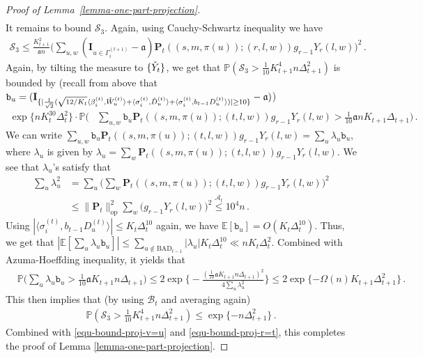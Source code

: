 \documentclass[11pt]{article}
\numberwithin{equation}{section}
\begin{document}
\begin{proof}[Proof of Lemma~\ref{lemma-one-part-projection}]
\begin{align}
\end{align}
It remains to bound $\mathcal S_3$. Again, using Cauchy-Schwartz inequality we have
\begin{align*}
    \mathcal S_3 \leq \frac{ K_{t+1}^2 }{ \mathfrak{a}n } \Big( \sum_{u,w} ( \mathbf{I}_{u \in \Gamma^{(t+1)}_i} -\mathfrak{a}) \mathbf{P}_t((s,m,\pi(u));(r,l,w)) g_{r-1} Y_r(l,w) \Big)^2 \,.  
\end{align*}
Again, by tilting the measure to $\{ \Check{Y}_t \}$, we get that $\mathbb{P}( \mathcal{S}_3 > \frac{1}{10} K_{t+1}^{4} n \Delta_{t+1}^2 )$ is bounded by (recall from above that $\mathtt{b}_u =  ( \mathbf{I}_{ \{ | \frac{1}{\sqrt{2}} ( \sqrt{12/K_t} \langle \beta^{(t)}_i, \Tilde{W}^{(t)}_u \rangle +  \langle \sigma^{(t)}_i, \Check{D}^{(t)}_u \rangle + \langle \sigma^{(t)}_i, b_{t-1}{D}^{(t)}_u \rangle ) | \geq 10 \}} -\mathfrak{a})$)
\begin{align*}
    \exp \{ n K_t^{30} \Delta_t^2 \} \cdot
    \mathbb{P} \Big( & \sum_{u,w} \mathtt{b}_u \mathbf{P}_t ((s,m,\pi(u));(t,l,w)) g_{r-1} Y_r(l,w) > \frac{1}{10} \mathfrak{a} n K_{t+1} \Delta_{t+1} \Big) \,.
\end{align*}
We can write $ \sum_{u,w} \mathtt{b}_u \mathbf{P}_t ((s,m,\pi(u));(t,l,w)) g_{r-1} Y_r(l,w) =  \sum_{u} \lambda_{u} \mathtt{b}_u $, where $\lambda_u$ is given by $\lambda_u = \sum_{w} \mathbf{P}_t((s,m,\pi(u));(t,l,w)) g_{r-1} Y_r(l,w)$. We see that $\lambda_u$'s satisfy that
\begin{align*}
    \sum_{u} \lambda_u^2 &= \sum_{u} \Big( \sum_{w} \mathbf{P}_t((s,m,\pi(u));(t,l,w)) g_{r-1} Y_r(l,w) \Big)^2 \\
    & \leq \| \mathbf{P}_t \|_{\mathrm{op}}^2 \sum_{w} \big( g_{r-1} Y_r(l,w) \big)^2 \overset{\mathcal{A}_t}{\leq} 10^4 n  \,.
\end{align*}
Using $| \langle \sigma^{(t)}_i, b_{t-1}{D}^{(t)}_u \rangle | \leq K_{t} \Delta_{t}^{10}$ again, we have $\mathbb{E}[\mathtt{b}_u] = O(K_t \Delta_t^{10})$. Thus, we get that $|\mathbb E[\sum_{u} \lambda_u \mathtt{b}_u] | \leq \sum_{u \not \in \mathrm{BAD}_{t-1}} |\lambda_{u}| K_t \Delta_{t}^{10} \ll n K_{t} \Delta_t^2$. Combined with Azuma-Hoeffding inequality, it yields that
\begin{align*}
    & \mathbb{P} \big( \sum_{u} \lambda_{u} \mathtt{b}_u > \tfrac{1}{10} \mathfrak{a} K_{t+1} n \Delta_{t+1} \big) \leq 2 \exp \Big\{ - \frac{ ( \frac{1}{10} \mathfrak{a} K_{t+1} n \Delta_{t+1} )^2 }{ 4\sum_{u} \lambda_u^2} \Big\} \leq 2 \exp \{ - \Omega(n)  K_{t+1} \Delta_{t+1}^2 \} \,.
\end{align*}
This then implies that (by using $\mathcal B_t$ and averaging again)
\begin{align}
    \mathbb{P}( \mathcal S_3 > \frac{1}{10} K_{t+1}^{4} n \Delta_{t+1}^2 ) \leq \exp \{ - n \Delta_{t+1}^2  \} \,.
    \label{equ-bound-proj-r<t}
\end{align}
Combined with \eqref{equ-bound-proj-v=u} and  \eqref{equ-bound-proj-r=t}, this completes the proof of Lemma \ref{lemma-one-part-projection}.
\end{proof}
\end{document}
